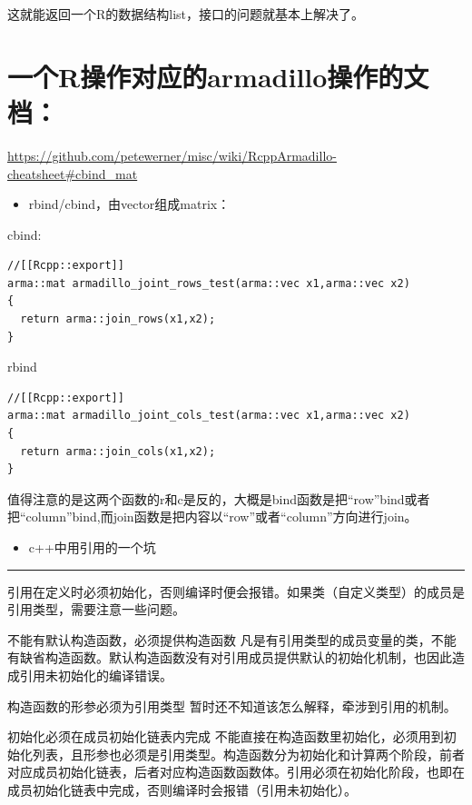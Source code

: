 \documentclass[
]{book}
\providecommand{\tightlist}{%
  \setlength{\itemsep}{0pt}\setlength{\parskip}{0pt}}
\theoremstyle{definition}
\theoremstyle{definition}
\theoremstyle{definition}
\theoremstyle{remark}
\begin{document}
这就能返回一个R的数据结构list，接口的问题就基本上解决了。

\hypertarget{ux4e00ux4e2arux64cdux4f5cux5bf9ux5e94ux7684armadilloux64cdux4f5cux7684ux6587ux6863}{%
\section{一个R操作对应的armadillo操作的文档：}\label{ux4e00ux4e2arux64cdux4f5cux5bf9ux5e94ux7684armadilloux64cdux4f5cux7684ux6587ux6863}}

\url{https://github.com/petewerner/misc/wiki/RcppArmadillo-cheatsheet\#cbind_mat}

\begin{itemize}
\tightlist
\item
  rbind/cbind，由vector组成matrix：
\end{itemize}

cbind:

\begin{verbatim}
//[[Rcpp::export]]
arma::mat armadillo_joint_rows_test(arma::vec x1,arma::vec x2)
{
  return arma::join_rows(x1,x2);
}
\end{verbatim}

rbind

\begin{verbatim}
//[[Rcpp::export]]
arma::mat armadillo_joint_cols_test(arma::vec x1,arma::vec x2)
{
  return arma::join_cols(x1,x2);
}
\end{verbatim}

值得注意的是这两个函数的r和c是反的，大概是bind函数是把``row''bind或者把``column''bind,而join函数是把内容以``row''或者``column''方向进行join。

\begin{itemize}
\tightlist
\item
  c++中用引用的一个坑
\end{itemize}

\begin{center}\rule{0.5\linewidth}{0.5pt}\end{center}

引用在定义时必须初始化，否则编译时便会报错。如果类（自定义类型）的成员是引用类型，需要注意一些问题。

不能有默认构造函数，必须提供构造函数
凡是有引用类型的成员变量的类，不能有缺省构造函数。默认构造函数没有对引用成员提供默认的初始化机制，也因此造成引用未初始化的编译错误。

构造函数的形参必须为引用类型
暂时还不知道该怎么解释，牵涉到引用的机制。

初始化必须在成员初始化链表内完成
不能直接在构造函数里初始化，必须用到初始化列表，且形参也必须是引用类型。构造函数分为初始化和计算两个阶段，前者对应成员初始化链表，后者对应构造函数函数体。引用必须在初始化阶段，也即在成员初始化链表中完成，否则编译时会报错（引用未初始化）。
\end{document}
